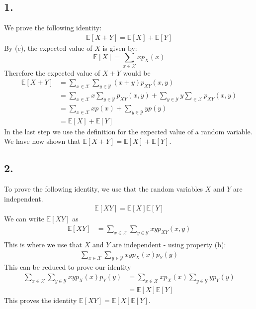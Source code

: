 \documentclass[a4paper]{article}
\begin{document}
\subsection*{1.}
We prove the following identity:
\begin{align*}
\mathbb{E}[X+Y]=\mathbb{E}[X]+\mathbb{E}[Y]
\end{align*}
By (c), the expected value of $X$ is given by:
$$\mathbb{E}[X]=\sum_{x\in \mathcal{X}}xp_X(x)$$
Therefore the expected value of $X+Y$ would be
\begin{align*}
\mathbb{E}[X+Y] &=\sum_{x\in \mathcal{X}}\sum_{y\in \mathcal{Y}} (x+y)p_{XY}(x,y) \\
                &= \sum_{x\in \mathcal{X}}x\sum_{y\in \mathcal{Y}} p_{XY}(x,y)+ \sum_{y\in \mathcal{Y}}y\sum_{\in \mathcal{X}} p_{XY}(x,y) \\
                &= \sum_{x\in \mathcal{X}}xp(x)+\sum_{y\in \mathcal{Y}}yp(y) \\
                &= \mathbb{E}[X]+\mathbb{E}[Y]
\end{align*}
In the last step we use the definition for the expected value of a random variable. We have now shown that $\mathbb{E}[X+Y]=\mathbb{E}[X]+\mathbb{E}[Y]$.
\subsection*{2.}
To prove the following identity, we use that the random variables $X$ and $Y$ are independent.
\begin{align*}
\mathbb{E}[XY]=\mathbb{E}[X]\mathbb{E}[Y]
\end{align*}
We can write $\mathbb{E}[XY]$ as
\begin{align*}
\mathbb{E}[XY]           &= \sum_{x\in \mathcal{X}}\sum_{y\in \mathcal{Y}} xy p_{XY}(x,y)\\
\end{align*}
This is where we use that $X$ and $Y$ are independent - using property (b):
\begin{align*}
\sum_{x\in \mathcal{X}}\sum_{y\in \mathcal{Y}} xyp_{X}(x)p_{Y}(y)
\end{align*}
This can be reduced to prove our identity
\begin{align*}
\sum_{x\in \mathcal{X}}\sum_{y\in \mathcal{Y}} xyp_{X}(x)p_{Y}(y) &= \sum_{x\in \mathcal{X}}xp_{X}(x)\sum_{y\in \mathcal{Y}} yp_{Y}(y) \\
&= \mathbb{E}[X]\mathbb{E}[Y]
\end{align*}
This proves the identity $\mathbb{E}[XY]=\mathbb{E}[X]\mathbb{E}[Y]$.
\end{document}

